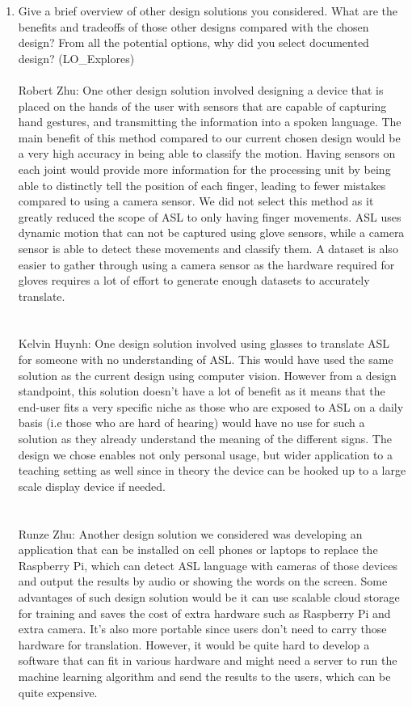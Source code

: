 \documentclass[12pt, titlepage]{article}
\begin{document}
\begin{enumerate}
  \item Give a brief overview of other design solutions you considered.  What
  are the benefits and tradeoffs of those other designs compared with the chosen
  design?  From all the potential options, why did you select documented design?
  (LO\_Explores)
  ~\\
  \\
  Robert Zhu: One other design solution involved designing a device that is placed on the hands of the user with sensors that are capable of capturing 
  hand gestures, and transmitting the information into a spoken language. The main benefit of this method compared to our current chosen design would 
  be a very high accuracy in being able to classify the motion. Having sensors on each joint would provide more information for the processing unit by 
  being able to distinctly tell the position of each finger, leading to fewer mistakes compared to using a camera sensor. We did not select this method 
  as it greatly reduced the scope of ASL to only having finger movements. ASL uses dynamic motion that can not be captured using glove sensors, while a 
  camera sensor is able to detect these movements and classify them. A dataset is also easier to gather through using a camera sensor as the hardware 
  required for gloves requires a lot of effort to generate enough datasets to accurately translate.
  \\
  ~\\
  \\
  Kelvin Huynh: One design solution involved using glasses to translate ASL for someone with no understanding of ASL. This would have used the same solution 
  as the current design using computer vision. However from a design standpoint, this solution doesn’t have a lot of benefit as it means that the end-user 
  fits a very specific niche as those who are exposed to ASL on a daily basis (i.e those who are hard of hearing) would have no use for such a solution as they 
  already understand the meaning of the different signs. The design we chose enables not only personal usage, but wider application to a teaching setting as 
  well since in theory the device can be hooked up to a large scale display device if needed.
  \\
  ~\\
  \\
  Runze Zhu: Another design solution we considered was developing an application that can be installed on cell phones or laptops to replace the Raspberry Pi, which can detect ASL language with cameras of those devices and output the results by audio or showing the words on the screen. Some advantages of such design solution would be it can use scalable cloud storage for training and saves the cost of extra hardware such as Raspberry Pi and extra camera. It’s also more portable since users don’t need to carry those hardware for translation. However, it would be quite hard to develop a software that can fit in various hardware and might need a server to run the machine learning algorithm and send the results to the users, which can be quite expensive.

\end{enumerate}
\end{document}
